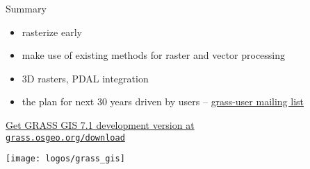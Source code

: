 \documentclass[xcolor={dvipsnames,usenames},beamer,aspectratio=169]{beamer}
\begin{document}
\begin{frame}{}

\vspace*{0.05\textheight}

\begin{block}{Summary}
 \begin{itemize}
  \item rasterize early
  \item make use of existing methods for raster and vector processing
  \item 3D rasters, PDAL integration
  \item the plan for next 30 years driven by users
    -- \href{https://lists.osgeo.org/listinfo/grass-user}{grass-user mailing list}
 \end{itemize}
\end{block}

\bigskip

\centering
\href{https://grass.osgeo.org/download/}{%
Get GRASS GIS 7.1 development version at\\
\texttt{grass.osgeo.org/download}%
}

\smallskip

\texttt{[image: logos/grass\_gis]}


\end{frame}
\end{document}
